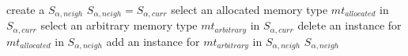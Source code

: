 \setlength{\textfloatsep}{0.2cm}
\begin{algorithm2e}[h]
		create a $S_{\alpha,neigh}$\;
		{
			$S_{\alpha,neigh}=S_{\alpha,curr}$\;
			select an allocated memory type $mt_{allocated}$ in $S_{\alpha,curr}$\;
			select an arbitrary memory type $mt_{arbitrary}$ in $S_{\alpha,curr}$\;
			delete an instance for $mt_{allocated}$ in $S_{\alpha,neigh}$\;
			add an instance for $mt_{arbitrary}$ in $S_{\alpha,neigh}$\;
		}
		\Return $S_{\alpha,neigh}$\;
	\caption{$Neighbor_{\alpha}$()}
	\label{algo:sa_alfa_neigh_1}
\end{algorithm2e}
\setlength{\textfloatsep}{0.2cm}